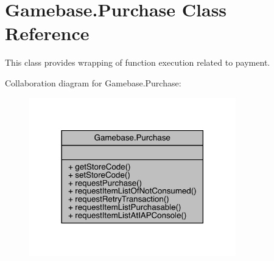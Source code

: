 \hypertarget{classcom_1_1toast_1_1android_1_1gamebase_1_1_gamebase_1_1_purchase}{}\section{Gamebase.\+Purchase Class Reference}
\label{classcom_1_1toast_1_1android_1_1gamebase_1_1_gamebase_1_1_purchase}


This class provides wrapping of function execution related to payment.  




Collaboration diagram for Gamebase.\+Purchase\+:\nopagebreak
\begin{figure}[H]
\begin{center}
\leavevmode
\includegraphics[width=254pt]{classcom_1_1toast_1_1android_1_1gamebase_1_1_gamebase_1_1_purchase__coll__graph}
\end{center}
\end{figure}
